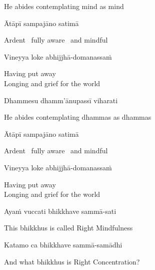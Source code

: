 \begin{english}
  He abides contemplating mind as mind
\end{english}

Ātāpī sampajāno satimā

\begin{english}
  Ardent \breathmark\ fully aware \breathmark\ and mindful
\end{english}

Vineyya loke abhijjhā-domanassaṁ

\begin{english}
  Having put away\\
  Longing and grief for the world
\end{english}

Dhammesu dhamm'ānupassī viharati

\begin{english}
  He abides contemplating dhammas as dhammas\ifdigitalversion\makeatletter\hyperlink{endnote63-appendix}\makeatother\fi
\end{english}

Ātāpī sampajāno satimā

\begin{english}
  Ardent \breathmark\ fully aware \breathmark\ and mindful
\end{english}

Vineyya loke abhijjhā-domanassaṁ

\begin{english}
  Having put away\\
  Longing and grief for the world
\end{english}

Ayaṁ vuccati bhikkhave sammā-sati

\begin{english}
  This bhikkhus is called Right Mindfulness
\end{english}

Katamo ca bhikkhave sammā-samādhi

\begin{english}
  And what bhikkhus is Right Concentration?
\end{english}

